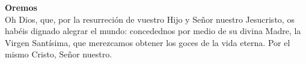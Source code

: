 \textbf{Oremos}\\
Oh Dios, que, por la resurreción de vuestro Hijo y Señor nuestro Jesucristo, os habéis dignado alegrar el mundo: 
concedednos por medio de su divina Madre, la Virgen Santísima, que merezcamos obtener los goces de la vida eterna. 
Por el mismo Cristo, Señor nuestro.\\[2mm]
